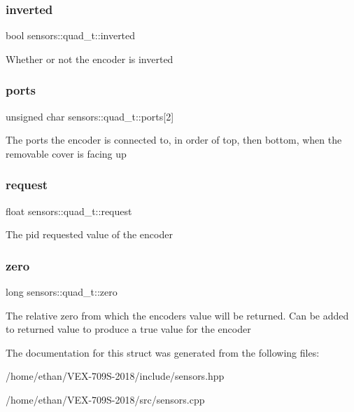 \subsubsection{\texorpdfstring{inverted}{inverted}}
{\footnotesize\ttfamily bool sensors\+::quad\+\_\+t\+::inverted}

Whether or not the encoder is inverted \mbox{\label{structsensors_1_1quad__t_ab3ac2cbedde9a5d8cb680e8c4bcdec74}} 
\subsubsection{\texorpdfstring{ports}{ports}}
{\footnotesize\ttfamily unsigned char sensors\+::quad\+\_\+t\+::ports\mbox{[}2\mbox{]}}

The ports the encoder is connected to, in order of top, then bottom, when the removable cover is facing up \mbox{\label{structsensors_1_1quad__t_ab1cf656f73ea0165459e90c035c0b03c}} 
\subsubsection{\texorpdfstring{request}{request}}
{\footnotesize\ttfamily float sensors\+::quad\+\_\+t\+::request}

The pid requested value of the encoder \mbox{\label{structsensors_1_1quad__t_a06d5116929f4ed2878d452c02470c644}} 
\subsubsection{\texorpdfstring{zero}{zero}}
{\footnotesize\ttfamily long sensors\+::quad\+\_\+t\+::zero}

The relative zero from which the encoder\textquotesingle{}s value will be returned. Can be added to returned value to produce a true value for the encoder 

The documentation for this struct was generated from the following files\+:\begin{DoxyCompactItemize}
\item 
/home/ethan/\+V\+E\+X-\/709\+S-\/2018/include/sensors.\+hpp\item 
/home/ethan/\+V\+E\+X-\/709\+S-\/2018/src/sensors.\+cpp\end{DoxyCompactItemize}
